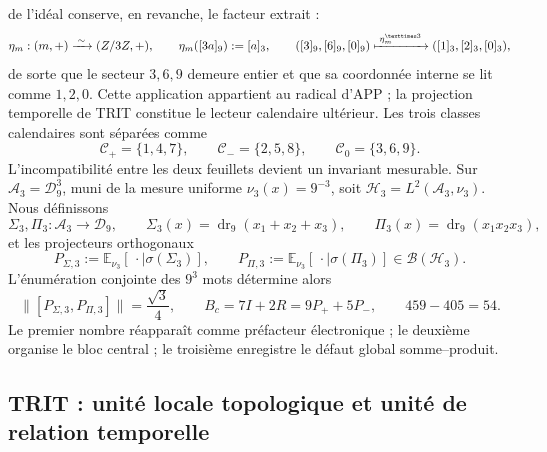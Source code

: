 de l'idéal conserve, en revanche, le facteur extrait :
\begin{equation}
\eta_{\mathfrak m}:(\mathfrak m,+)
\xrightarrow{\;\sim\;}(\mathbb Z/3\mathbb Z,+),
\qquad
\eta_{\mathfrak m}([3a]_9):=[a]_3,
\qquad
([3]_9,[6]_9,[0]_9)
\xmapsto{\;\eta_{\mathfrak m}^{\times3}\;}
([1]_3,[2]_3,[0]_3),
\label{p12-83-c3-s1:eq:app-369-120}
\end{equation}
de sorte que le secteur \(3,6,9\) demeure entier et que sa coordonnée interne se
lit comme \(1,2,0\). Cette application appartient au radical d'APP ; la
projection temporelle de TRIT constitue le lecteur calendaire ultérieur. Les
trois classes calendaires
sont séparées comme
\[
\mathcal C_+=\{1,4,7\},\qquad
\mathcal C_-=\{2,5,8\},\qquad
\mathcal C_0=\{3,6,9\}.
\]
L'incompatibilité entre les deux feuillets devient un invariant mesurable. Sur
\(\mathscr A_3=\mathcal D_9^3\), muni de la mesure uniforme
\(\nu_3(x)=9^{-3}\), soit
\(\mathcal H_3=L^2(\mathscr A_3,\nu_3)\). Nous définissons
\[
\Sigma_3,\Pi_3:\mathscr A_3\longrightarrow\mathcal D_9,
\qquad
\Sigma_3(x)=\operatorname{dr}_9(x_1+x_2+x_3),
\qquad
\Pi_3(x)=\operatorname{dr}_9(x_1x_2x_3),
\]
et les projecteurs orthogonaux
\[
P_{\Sigma,3}:=\mathbb E_{\nu_3}[\,\cdot\mid\sigma(\Sigma_3)],
\qquad
P_{\Pi,3}:=\mathbb E_{\nu_3}[\,\cdot\mid\sigma(\Pi_3)]
\in\mathcal B(\mathcal H_3).
\]
L'énumération conjointe des \(9^3\) mots détermine alors
\[
\bigl\|[P_{\Sigma,3},P_{\Pi,3}]\bigr\|=\frac{\sqrt3}{4},
\qquad
B_c=7I+2R=9P_++5P_-,
\qquad
459-405=54.
\]
Le premier nombre réapparaît comme préfacteur électronique ; le deuxième organise
le bloc central ; le troisième enregistre le défaut global somme--produit.

\subsection{TRIT : unité locale topologique et unité de relation temporelle}

